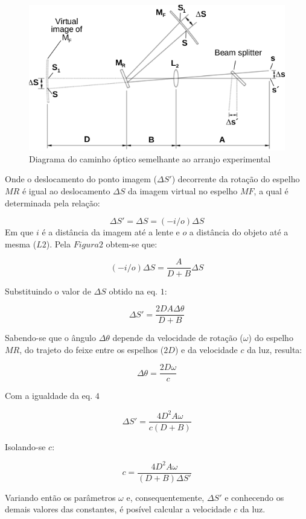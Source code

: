 \begin{figure}[!ht]
	\centering
	\includegraphics[scale=0.4]{3.png}
	\caption{Diagrama do caminho óptico semelhante ao arranjo experimental \cite{PASCO}}
\end{figure}
Onde o deslocamento do ponto imagem ($\Delta S'$) decorrente da rotação do espelho $MR$ é igual ao deslocamento $\Delta S$ da imagem virtual no espelho $MF$, a qual é determinada pela relação:

\begin{equation}
	\Delta S'= \Delta S=(-i/o)\Delta S
\end{equation}
Em que $i$ é a distância da imagem até a lente e $o$ a distância do objeto até a mesma ($L2$). Pela $Figura2$ obtem-se que:

\begin{equation}
	(-i/o)\Delta S=\frac{A}{D+B}\Delta S
\end{equation}
 
Substituindo o valor de $\Delta S$ obtido na eq. $1$:

\begin{equation}
	\Delta S'=\frac{2DA\Delta\theta}{D+B}
\end{equation}

Sabendo-se que o ângulo $\Delta\theta$ depende da velocidade de rotação ($\omega$) do espelho $MR$, do trajeto do feixe entre os espelhos ($2D$) e da velocidade $c$ da luz, resulta:

\begin{equation}
	\Delta\theta=\frac{2D\omega}{c}
\end{equation}

Com a igualdade da eq. $4$

\begin{equation}
	\Delta S'=\frac{4D^{2}A\omega}{c(D+B)}
\end{equation}

Isolando-se $c$:

\begin{equation}
	c=\frac{4D^{2}A\omega}{(D+B)\Delta S'}
\end{equation}

Variando então os parâmetros $\omega$ e, consequentemente, $\Delta S'$ e conhecendo os demais valores das constantes, é posível calcular a velocidade $c$ da luz.



